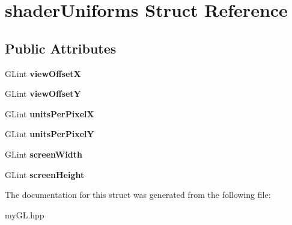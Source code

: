 \hypertarget{structshaderUniforms}{}\section{shader\+Uniforms Struct Reference}
\label{structshaderUniforms}
\subsection*{Public Attributes}
\begin{DoxyCompactItemize}
\item 
G\+Lint {\bfseries view\+OffsetX}\hypertarget{structshaderUniforms_a3004430b1a8a037fd9f4fd5a6df6b891}{}\label{structshaderUniforms_a3004430b1a8a037fd9f4fd5a6df6b891}

\item 
G\+Lint {\bfseries view\+OffsetY}\hypertarget{structshaderUniforms_a043240eb432f2e616fc99039a768cc6f}{}\label{structshaderUniforms_a043240eb432f2e616fc99039a768cc6f}

\item 
G\+Lint {\bfseries units\+Per\+PixelX}\hypertarget{structshaderUniforms_abc58fff6db1b193c316508f10f18734b}{}\label{structshaderUniforms_abc58fff6db1b193c316508f10f18734b}

\item 
G\+Lint {\bfseries units\+Per\+PixelY}\hypertarget{structshaderUniforms_a478501f37eec7e0fb1b6ea0f4100388c}{}\label{structshaderUniforms_a478501f37eec7e0fb1b6ea0f4100388c}

\item 
G\+Lint {\bfseries screen\+Width}\hypertarget{structshaderUniforms_a1d054bf6536a87b850385382396951c3}{}\label{structshaderUniforms_a1d054bf6536a87b850385382396951c3}

\item 
G\+Lint {\bfseries screen\+Height}\hypertarget{structshaderUniforms_aa04750af4a7969b67a4b6ffac4b62e0e}{}\label{structshaderUniforms_aa04750af4a7969b67a4b6ffac4b62e0e}

\end{DoxyCompactItemize}


The documentation for this struct was generated from the following file\+:\begin{DoxyCompactItemize}
\item 
my\+G\+L.\+hpp\end{DoxyCompactItemize}
